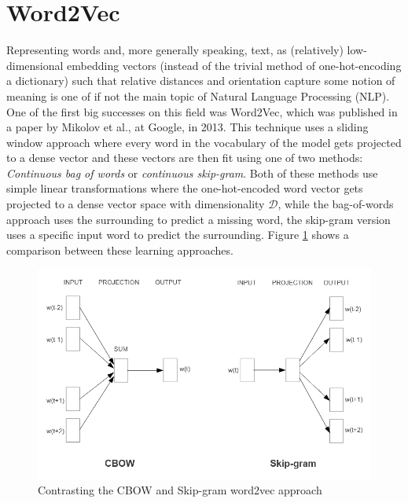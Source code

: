 \documentclass[draft,final]{vutinfth} %
\begin{document}
\section{Word2Vec}
Representing words and, more generally speaking, text, as (relatively) low-dimensional embedding vectors (instead of the trivial method of one-hot-encoding a dictionary) such that relative distances and orientation capture some notion of meaning is one of if not the main topic of Natural Language Processing (NLP). One of the first big successes on this field was Word2Vec, which was published in a paper by Mikolov et al., at Google, in 2013. This technique uses a sliding window approach where every word in the vocabulary of the model gets projected to a dense vector and these vectors are then fit using one of two methods: \textit{Continuous bag of words} or \textit{continuous skip-gram}. Both of these methods use simple linear transformations where the one-hot-encoded word vector gets projected to a dense vector space with dimensionality $\mathcal{D}$, while the bag-of-words approach uses the surrounding to predict a missing word, the skip-gram version uses a specific input word to predict the surrounding. Figure \ref{fig:word2vec} shows a comparison between these learning approaches.
\begin{figure}
    \centering
    \includegraphics[width=0.9\linewidth]{thesis-figures/word2vec.png}
    \caption{Contrasting the CBOW and Skip-gram word2vec approach \cite[p. 5]{word2vec_preprint}}
    \label{fig:word2vec}
\end{figure}
\end{document}
